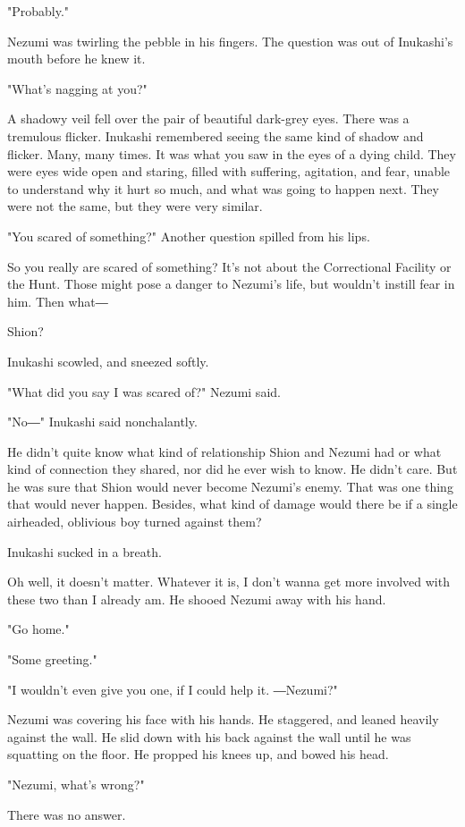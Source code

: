 "Probably."

Nezumi was twirling the pebble in his fingers. The question was out of
Inukashi's mouth before he knew it.

"What's nagging at you?"

A shadowy veil fell over the pair of beautiful dark-grey eyes. There was
a tremulous flicker. Inukashi remembered seeing the same kind of shadow
and flicker. Many, many times. It was what you saw in the eyes of a
dying child. They were eyes wide open and staring, filled with
suffering, agitation, and fear, unable to understand why it hurt so
much, and what was going to happen next. They were not the same, but
they were very similar.

"You scared of something?" Another question spilled from his lips.

So you really are scared of something? It's not about the Correctional
Facility or the Hunt. Those might pose a danger to Nezumi's life, but
wouldn't instill fear in him. Then what―

Shion?

Inukashi scowled, and sneezed softly.

"What did you say I was scared of?" Nezumi said.

"No―" Inukashi said nonchalantly.

He didn't quite know what kind of relationship Shion and Nezumi had or
what kind of connection they shared, nor did he ever wish to know. He
didn't care. But he was sure that Shion would never become Nezumi's
enemy. That was one thing that would never happen. Besides, what kind of
damage would there be if a single airheaded, oblivious boy turned
against them?

Inukashi sucked in a breath.

Oh well, it doesn't matter. Whatever it is, I don't wanna get more
involved with these two than I already am. He shooed Nezumi away with
his hand.

"Go home."

"Some greeting."

"I wouldn't even give you one, if I could help it. ―Nezumi?"

Nezumi was covering his face with his hands. He staggered, and leaned
heavily against the wall. He slid down with his back against the wall
until he was squatting on the floor. He propped his knees up, and bowed
his head.

"Nezumi, what's wrong?"

There was no answer.

